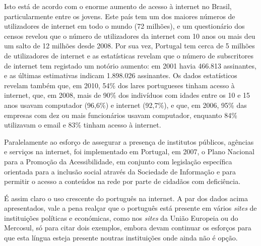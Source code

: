 \begin{multicols}{2}
Isto está de acordo com o enorme aumento de acesso à internet no Brasil, particularmente entre os jovens. Este país tem um dos maiores números de utilizadores de internet em todo o mundo (72 milhões)\cite{statop20}, e um questionário dos censos revelou que o número de utilizadores da internet com 10 anos ou mais deu um salto de 12 milhões desde 2008\cite{mybroadband}. Por sua vez, Portugal tem cerca de 5 milhões de utilizadores de internet \cite{stat4} \cite{stat15} e as estatísticas revelam que o número de subscritores de internet tem registado um notório aumento: em 2001 havia 466.813 assinantes, e as últimas estimativas indicam 1.898.026 assinantes\cite{pordata}. Os dados estatísticos revelam também que, em 2010, 54\% dos lares portugueses tinham acesso à internet, que, em 2008, mais de 90\% dos indivíduos com idades entre os 10 e 15 anos usavam computador (96,6\%) e internet (92,7\%), e que, em 2006, 95\% das empresas com dez ou mais funcionários usavam computador, enquanto 84\% utilizavam o email e 83\% tinham acesso à internet\cite{pordata}.



Paralelamente ao esforço de assegurar a presença de institutos públicos, agências e serviços na internet, foi implementado em Portugal, em 2007, o Plano Nacional para a Promoção da Acessibilidade, em conjunto com legislação específica\cite{umic} orientada para a inclusão social através da Sociedade de Informação e para permitir o acesso a conteúdos na rede por parte de cidadãos com deficiência.

É assim claro o uso crescente do português na internet. A par dos dados acima apresentados, vale a pena realçar que o português está presente em vários \textit{sites} de instituições políticas e económicas, como nos \textit{sites} da União Europeia ou do Mercosul, só para citar dois exemplos, embora devam continuar os esforços para que esta língua esteja presente noutras instituições onde ainda não é opção.

\end{multicols}

\clearpage



